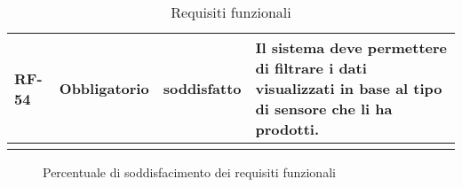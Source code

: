 \begin{longtable}{|>{\centering\arraybackslash}m{}|>{\centering\arraybackslash}m{}|>{\centering\arraybackslash}m{}|>{\centering\arraybackslash}m{}|}
	\\\hline
	RF-54           & Obbligatorio        & soddisfatto                                                                                                           & Il sistema deve permettere di filtrare i dati visualizzati in base al tipo di sensore che li ha prodotti.
	\\\hline
	\caption{Requisiti funzionali}
\end{longtable}

\begin{figure}[!h]
	\centering
	\caption{Percentuale di soddisfacimento dei requisiti funzionali}
\end{figure}

